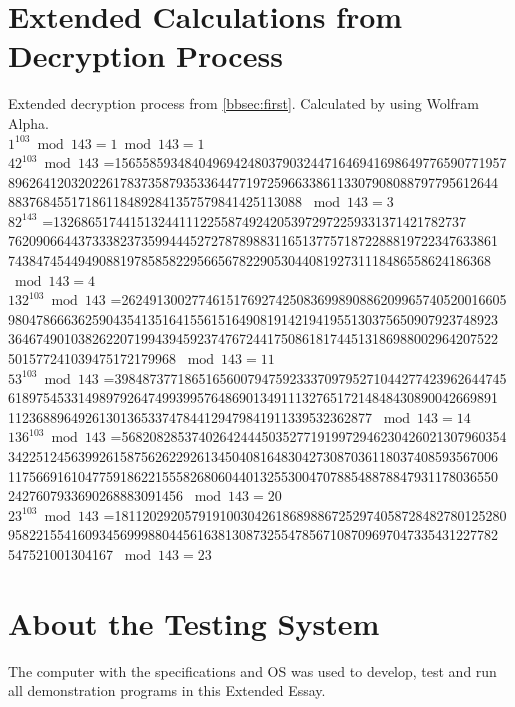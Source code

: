 \documentclass[a4paper, 12pt]{article}
\begin{document}
\newpage
\singlespace
\appendix
\section{Extended Calculations from Decryption Process}
\label{calc}
Extended decryption process from \ref{bbsec:first}. Calculated by using Wolfram Alpha.\cite{wa}\\

$1^{103} \bmod 143 =1 \bmod 143 = 1$\\

  $42 ^{103} \bmod 143$ =15655859348404969424803790324471646941698649776590771957
8962641203202261783735879353364477197259663386113307908088797795612644
883768455171861184892841357579841425113088 $\bmod 143 = 3$\\

$82 ^ {143}$ =13268651744151324411122558749242053972972259331371421782737
7620906644373338237359944452727878988311651377571872288819722347633861
743847454494908819785858229566567822905304408192731118486558624186368
$\bmod 143 = 4$\\

$132^ {103} \bmod 143$ =2624913002774615176927425083699890886209965740520016605
9804786663625904354135164155615164908191421941955130375650907923748923
3646749010382622071994394592374767244175086181744513186988002964207522
501577241039475172179968 $\bmod 143 = 11$\\

$53^ {103} \bmod 143$ =39848737718651656007947592333709795271044277423962644745
6189754533149897926474993995764869013491113276517214848430890042669891
1123688964926130136533747844129479841911339532362877 $\bmod 143 = 14$\\

$136 ^{103} \bmod 143$ =5682082853740264244450352771919972946230426021307960354
3422512456399261587562622926134504081648304273087036118037408593567006
1175669161047759186221555826806044013255300470788548878847931178036550
2427607933690268883091456 $\bmod 143 = 20$\\

$23 ^{103} \bmod 143$ =18112029205791910030426186898867252974058728482780125280
9582215541609345699988044561638130873255478567108709697047335431227782
547521001304167 $\bmod 143 = 23$\\


\newpage

\section{About the Testing System}
\label{specs}
The computer with the specifications and OS\cite{BunsenLabs}\cite{Debian} was used to develop, test and run all demonstration
programs\cite{github} in this Extended Essay.
\end{document}
